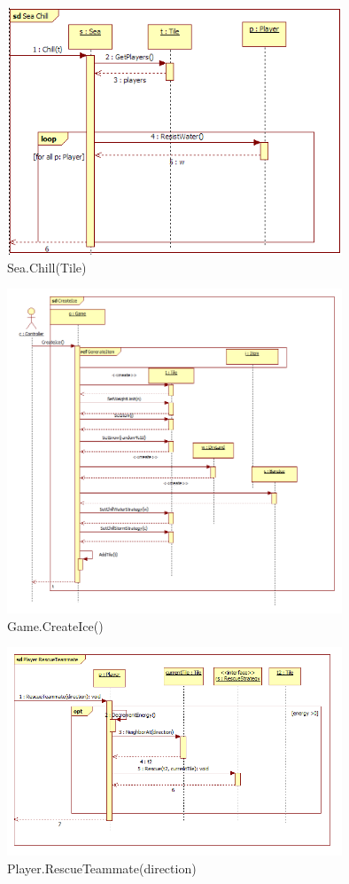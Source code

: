 \begin{figure}[H]
	\begin{center}
		\includegraphics[width=10cm]{chapters/chapter03/seqdiag/Sea_Chill.png}
		\caption{Sea.Chill(Tile)}
		\label{fig:SeaChill}
	\end{center}
\end{figure}
\begin{figure}[H]
	\begin{center}
		\includegraphics[width=10cm]{chapters/chapter03/seqdiag/Game_CreateIce.png}
		\caption{Game.CreateIce()}
		\label{fig:GameCreateIce}
	\end{center}
\end{figure}
\begin{figure}[H]
	\begin{center}
		\includegraphics[width=10cm]{chapters/chapter03/seqdiag/Player_RescueTeammate.png}
		\caption{Player.RescueTeammate(direction)}
		\label{fig:Player.RescueTeammate}
	\end{center}
\end{figure}
